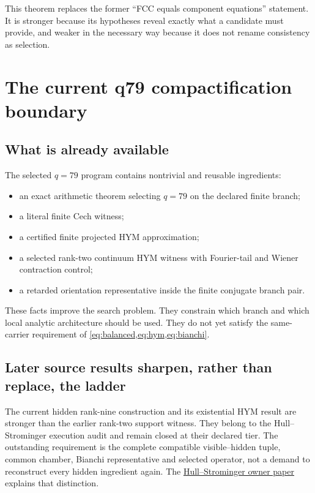 \documentclass[11pt]{article}
\numberwithin{equation}{section}
\theoremstyle{definition}
\theoremstyle{plain}
\theoremstyle{remark}
\begin{document}
This theorem replaces the former ``FCC equals component equations''
statement.  It is stronger because its hypotheses reveal exactly what a
candidate must provide, and weaker in the necessary way because it does not
rename consistency as selection.

\section{The current q79 compactification boundary}

\subsection{What is already available}

The selected \(q=79\) program contains nontrivial and reusable ingredients:
\begin{itemize}[leftmargin=2em]
\item an exact arithmetic theorem selecting \(q=79\) on the declared finite
      branch;
\item a literal finite Cech witness;
\item a certified finite projected HYM approximation;
\item a selected rank-two continuum HYM witness with Fourier-tail and Wiener
      contraction control;
\item a retarded orientation representative inside the finite conjugate
      branch pair.
\end{itemize}
These facts improve the search problem.  They constrain which branch and
which local analytic architecture should be used.  They do not yet satisfy
the same-carrier requirement of \cref{eq:balanced,eq:hym,eq:bianchi}.

\subsection{Later source results sharpen, rather than replace, the ladder}
\label{sec:later-selection-imports}

The current hidden rank-nine construction and its existential HYM result
are stronger than the earlier rank-two support witness. They belong to the
Hull--Strominger execution audit and remain closed at their declared tier.
The outstanding requirement is the complete compatible visible--hidden
tuple, common chamber, Bianchi representative and selected operator, not
a demand to reconstruct every hidden ingredient again. The
\href{https://github.com/PeterNero/mtt-papers/tree/main/papers/modal-triplet-theory-from-mtt-to-the-strominger-heterot-b2789a83}{Hull--Strominger owner paper}
explains that distinction.
\end{document}
